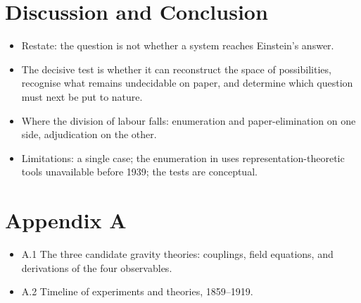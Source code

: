 \documentclass{article}
\begin{document}
\section{Discussion and Conclusion}
\label{sec:discussion-conclusion}
\begin{itemize}
  \item Restate: the question is not whether a system reaches Einstein's answer.
  \item The decisive test is whether it can reconstruct the space of possibilities, recognise what remains undecidable on paper, and determine which question must next be put to nature.
  \item Where the division of labour falls: enumeration and paper-elimination on one side, adjudication on the other.
  \item Limitations: a single case; the enumeration in  uses representation-theoretic tools unavailable before 1939; the tests are conceptual.
\end{itemize}




\appendix
\section{Appendix A}
\begin{itemize}
  \item A.1 The three candidate gravity theories: couplings, field equations, and derivations of the four observables.
  \item A.2 Timeline of experiments and theories, 1859--1919.
\end{itemize}
\end{document}
